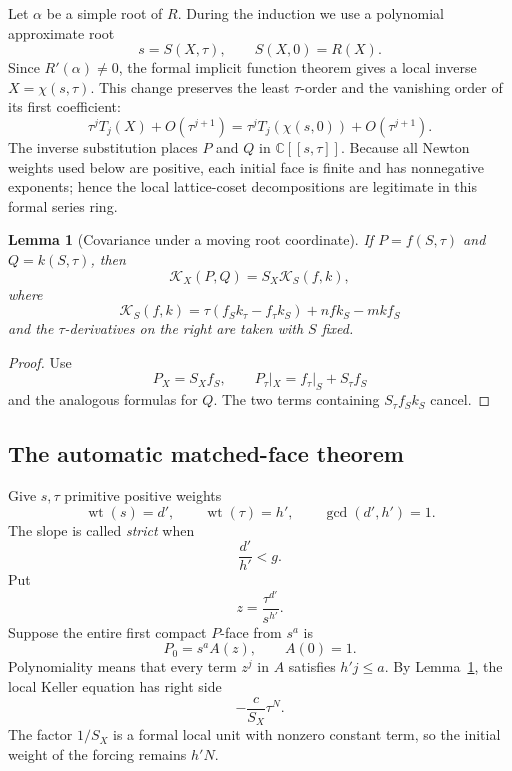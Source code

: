 \documentclass[11pt]{article}
\newtheorem{lemma}[theorem]{Lemma}
\theoremstyle{definition}
\theoremstyle{remark}
\newcommand{\C}{\mathbb C}
\newcommand{\KX}{\mathcal K_X}
\newcommand{\KS}{\mathcal K_S}
\newcommand{\wt}{\operatorname{wt}}
\begin{document}
Let \(\alpha\) be a simple root of \(R\).  During the induction we use a
polynomial approximate root
\[
 s=S(X,\tau),\qquad S(X,0)=R(X).
\]
Since \(R'(\alpha)\neq0\), the formal implicit function theorem gives a
local inverse \(X=\chi(s,\tau)\).  This change preserves the least
\(\tau\)-order and the vanishing order of its first coefficient:
\[
 \tau^jT_j(X)+O(\tau^{j+1})
 =
 \tau^jT_j(\chi(s,0))+O(\tau^{j+1}).
\]
The inverse substitution places \(P\) and \(Q\) in
\(\C[[s,\tau]]\).  Because all Newton weights used below are positive,
each initial face is finite and has nonnegative exponents; hence the local
lattice-coset decompositions are legitimate in this formal series ring.

\begin{lemma}[Covariance under a moving root coordinate]
\label{lem:covariance}
If \(P=f(S,\tau)\) and \(Q=k(S,\tau)\), then
\begin{equation}
 \KX(P,Q)=S_X\KS(f,k),
\label{eq:covariance}
\end{equation}
where
\[
 \KS(f,k)
 =\tau(f_Sk_\tau-f_\tau k_S)+nfk_S-mkf_S
\]
and the \(\tau\)-derivatives on the right are taken with \(S\) fixed.
\end{lemma}

\begin{proof}
Use
\[
 P_X=S_Xf_S,\qquad
 P_\tau|_X=f_\tau|_S+S_\tau f_S
\]
and the analogous formulas for \(Q\).  The two terms containing
\(S_\tau f_Sk_S\) cancel.
\end{proof}

\subsection{The automatic matched-face theorem}

Give \(s,\tau\) primitive positive weights
\[
 \wt(s)=d',\qquad \wt(\tau)=h',\qquad
 \gcd(d',h')=1.
\]
The slope is called \emph{strict} when
\begin{equation}
 \frac{d'}{h'}<g.
\label{eq:strict}
\end{equation}
Put
\[
 z=\frac{\tau^{d'}}{s^{h'}}.
\]
Suppose the entire first compact \(P\)-face from \(s^a\) is
\begin{equation}
 P_0=s^aA(z),\qquad A(0)=1.
\label{eq:pface}
\end{equation}
Polynomiality means that every term \(z^j\) in \(A\) satisfies
\(h'j\leq a\).  By Lemma~\ref{lem:covariance}, the local Keller
equation has right side
\[
 -\frac{c}{S_X}\tau^N.
\]
The factor \(1/S_X\) is a formal local unit with nonzero constant term,
so the initial weight of the forcing remains \(h'N\).
\end{document}
